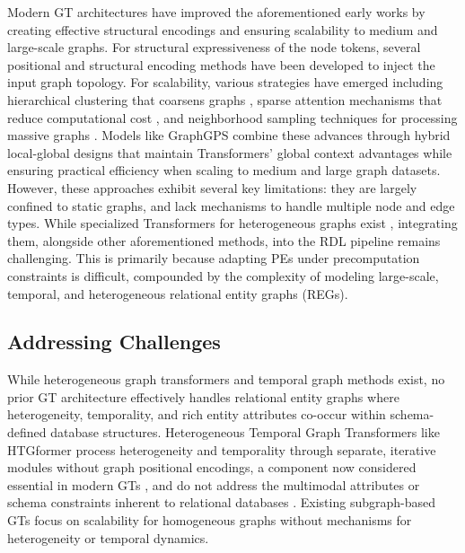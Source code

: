 \documentclass{article} %
\begin{document}
Modern GT architectures have improved the aforementioned early works by creating effective structural encodings and ensuring scalability to medium and large-scale graphs. For structural expressiveness of the node tokens, several positional and structural encoding methods have been developed \citep{dwivedi2022graph, canturk2023graph, limsign, huangstability, kanatsoulis2025learning} to inject the input graph topology. For scalability, various strategies have emerged including hierarchical clustering that coarsens graphs \citep{zhang2022hierarchical, zhu2023hierarchical}, sparse attention mechanisms that reduce computational cost \citep{rampavsek2022recipe, shirzad2023exphormer}, and neighborhood sampling techniques for processing massive graphs \citep{zhao2021gophormer, chen2022nagphormer, dwivedi2023graph}. Models like GraphGPS \citep{rampavsek2022recipe} combine these advances through hybrid local-global designs that maintain Transformers' global context advantages while ensuring practical efficiency when scaling to medium and large graph datasets. 
However, these approaches exhibit several key limitations: they are largely confined to static graphs, and lack mechanisms to handle multiple node and edge types. While specialized Transformers for heterogeneous graphs exist \citep{hu2020heterogeneous, mao2023hinormer, zhu2023hierarchical, zhai2024actions}, integrating them, alongside other aforementioned methods, into the RDL pipeline remains challenging. This is primarily because adapting PEs
under precomputation constraints is difficult, compounded by the complexity of modeling large-scale, temporal, and heterogeneous relational entity graphs (REGs).



\subsection{Addressing Challenges}
While heterogeneous graph transformers \citep{hu2020heterogeneous} and temporal graph methods exist, no prior GT architecture effectively handles relational entity graphs where heterogeneity, temporality, and rich entity attributes co-occur within schema-defined database structures. Heterogeneous Temporal Graph Transformers like HTGformer \citep{wang2025htgformer} process heterogeneity and temporality through separate, iterative modules without graph positional encodings, a component now considered essential in modern GTs \citep{rampavsek2022recipe, muller2023attending}, and do not address the multimodal attributes or schema constraints inherent to relational databases \citep{hu2024pytorch}. Existing subgraph-based GTs \citep{zhao2021gophormer, chen2022nagphormer} focus on scalability for homogeneous graphs without mechanisms for heterogeneity or temporal dynamics.
\end{document}

